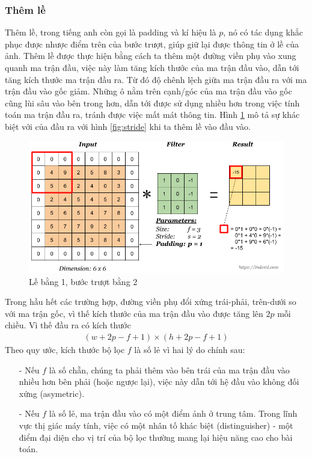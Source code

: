 \subsubsection{Thêm lề}
Thêm lề, trong tiếng anh còn gọi là padding và kí hiệu là $p$, nó có tác dụng khắc phục được nhược điểm trên của bước trượt, giúp giữ lại được thông tin ở lề của ảnh. Thêm lề được thực hiện bằng cách ta thêm một đường viền phụ vào xung quanh ma trận đầu, việc này làm tăng kích thước của ma trận đầu vào, dẫn tới tăng kích thước ma trận đầu ra. Từ đó độ chênh lệch giữa ma trận đầu ra với ma trận đầu vào gốc giảm. Những ô nằm trên cạnh/góc của ma trận đầu vào gốc cũng lùi sâu vào bên trong hơn, dẫn tới được sử dụng nhiều hơn trong việc tính toán ma trận đầu ra, tránh được việc mất mát thông tin. Hình \ref{fig:padding} mô tả sự khác biệt với của đầu ra với hình \ref{fig:stride} khi ta thêm lề vào đầu vào.
\begin{figure}[H]
	\begin{center}
		\includegraphics[scale=0.5]{chap3/image/cnn/padding/padding.png}
	\end{center}
	\caption{Lề bằng 1, bước trượt bằng 2 \protect \footnotemark}
	\label{fig:padding}
\end{figure}
Trong hầu hết các trường hợp, đường viền phụ đổi xứng trái-phải, trên-dưới so với ma trận gốc, vì thế kích thước của ma trận đầu vào được tăng lên $2p$ mỗi chiều. Vì thế đầu ra có kích thước 
\begin{align*}
(w+2p-f+1) \times (h+2p-f+1)
\end{align*}
Theo quy ước, kích thước bộ lọc $f$ là số lẻ vì hai lý do chính sau:
\begin{itemize}
\item[-]Nếu $f$ là số chẵn, chúng ta phải thêm vào bên trái của ma trận đầu vào nhiều hơn bên phải (hoặc ngược lại), việc này dẫn tới hệ đầu vào không đối xứng (asymetric).
\item[-]Nếu $f$ là số lẻ, ma trận đầu vào có một điểm ảnh ở trung tâm. Trong lĩnh vực thị giác máy tính, việc có một nhân tố khác biệt (distinguisher) - một điểm đại diện cho vị trí của bộ lọc thường mang lại hiệu năng cao cho bài toán.
\end{itemize}

